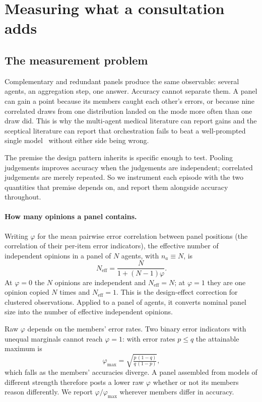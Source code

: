 \section{Measuring what a consultation adds}

\subsection{The measurement problem}
\label{sec:metrics}

Complementary and redundant panels produce the same
observable: several agents, an aggregation step, one answer. Accuracy cannot separate them.
A panel can gain a point because its members caught each other's errors, or because nine
correlated draws from one distribution landed on the mode more often than one draw did.
This is why the multi-agent medical
literature can report gains and the sceptical literature can report that orchestration fails to
beat a well-prompted single model~\citep{medagentboard, npjdm2026, confagents} without either
side being wrong.

The premise the design pattern inherits is specific enough to test. Pooling judgements improves
accuracy when the judgements are independent; correlated judgements are merely repeated. So we
instrument each episode with the two quantities that premise depends on, and report them
alongside accuracy throughout.

\paragraph{How many opinions a panel contains.}
Writing $\varphi$ for the mean pairwise error correlation between panel positions (the
correlation of their per-item error indicators), the effective number of independent opinions in a
panel of $N$ agents, with $n_a \equiv N$, is
\begin{equation}
N_{\mathrm{eff}} = \frac{N}{1 + (N-1)\varphi}.
\label{eq:neff}
\end{equation}
At $\varphi = 0$ the $N$ opinions are independent and $N_{\mathrm{eff}} = N$; at $\varphi = 1$
they are one opinion copied $N$ times and $N_{\mathrm{eff}} = 1$. This is the
design-effect correction for clustered observations. Applied to a panel of agents, it converts
nominal panel size into the number of effective independent opinions.

Raw $\varphi$ depends on the members' error rates. Two binary error
indicators with unequal marginals cannot reach $\varphi = 1$: with error rates $p \le q$ the
attainable maximum is
\begin{equation}
\varphi_{\max} = \sqrt{\tfrac{p\,(1-q)}{q\,(1-p)}},
\label{eq:phimax}
\end{equation}
which falls as the members' accuracies diverge. A panel assembled from models of different strength therefore posts a lower
raw $\varphi$ whether or not its members reason differently. We report $\varphi/\varphi_{\max}$
wherever members differ in accuracy.


